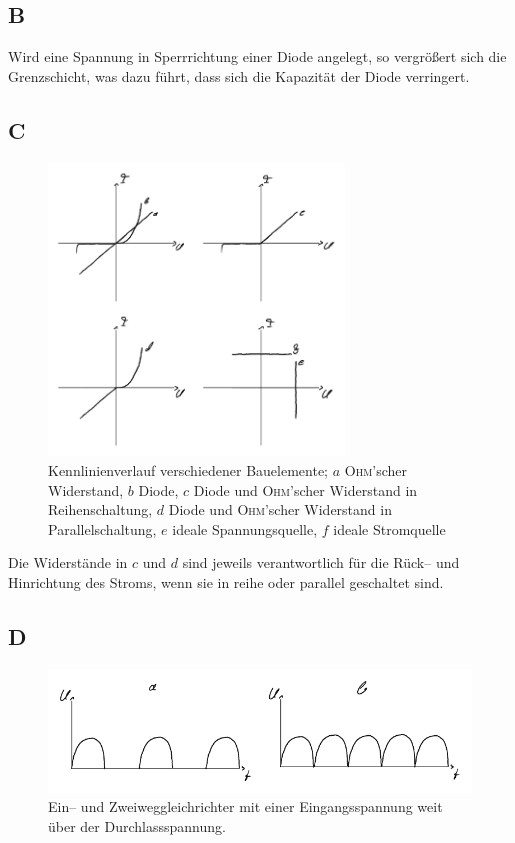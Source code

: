\documentclass[a4paper,12pt]{article}
\numberwithin{equation}{section}
\begin{document}
\subsection{B}
Wird eine Spannung in Sperrrichtung einer Diode angelegt, so vergrößert sich die Grenzschicht, was dazu führt, dass sich die Kapazität der Diode verringert.

\subsection{C}
\begin{figure}[h]
        \centering
        \includegraphics[width=0.7\textwidth]{C_crop.pdf}
        \caption[Kennlinienverlauf verschiedener Bauelemente]{Kennlinienverlauf verschiedener Bauelemente; $a$ \textsc{Ohm}'scher Widerstand, $b$ Diode, $c$ Diode und \textsc{Ohm}'scher Widerstand in Reihenschaltung, $d$ Diode und \textsc{Ohm}'scher Widerstand in Parallelschaltung, $e$ ideale Spannungsquelle, $f$ ideale Stromquelle}
\end{figure}
\noindent Die Widerstände in $c$ und $d$ sind jeweils verantwortlich für die Rück-- und Hinrichtung des Stroms, wenn sie in reihe oder parallel geschaltet sind.

\newpage
\subsection{D}
\begin{figure}[h]
        \centering
        \includegraphics[width=\textwidth]{D_crop.pdf}
        \caption[Ein-- und Zweiweggleichrichter]{Ein-- und Zweiweggleichrichter mit einer Eingangsspannung weit über der Durchlassspannung.}
\end{figure}
\end{document}

